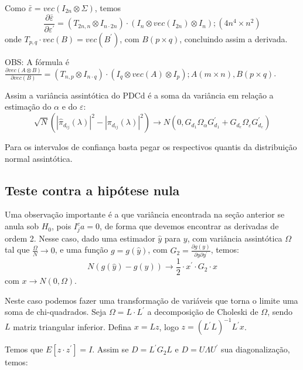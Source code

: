 \documentclass[a4paper,10pt]{article}
\begin{document}
Como $\bar{\varepsilon} = vec(I_{2n} \otimes \Sigma)$, temos
\begin{equation}
\frac{\partial \bar{\varepsilon}}{\partial \varepsilon^{'}} = (T_{2n,n} \otimes I_{n \cdot 2n}) \cdot (I_{n} \otimes vec(I_{2n}) \otimes I_{n}); (4n^{4} \times n^{2})
\end{equation}
onde $T_{p,q} \cdot vec(B) = vec(B^{'})$, com $B (p \times q)$, concluindo assim a derivada.

OBS: A fórmula é $\frac{\partial vec(A \otimes B)}{\partial vec(B)} = (T_{n,p} \otimes I_{n \cdot q}) \cdot (I_{q} \otimes vec(A) \otimes I_{p}); A (m \times n), B (p \times q)$.

Assim a variância assintótica do PDCd é a soma da variância em relação a estimação do $\alpha$ e do $\varepsilon$:
\begin{equation}
\sqrt{N} (|\hat{\pi}_{d_{ij}}(\lambda)|^{2} - |\pi_{d_{ij}}(\lambda)|^{2}) \to N(0, G_{d_1} \Omega_{\alpha} G_{d_1}^{'} + G_{d_e} \Omega_{\varepsilon} G_{d_e}^{'}) 
\end{equation}

Para os intervalos de confiança basta pegar os respectivos quantis da distribuição normal assintótica.

\subsection{Teste contra a hipótese nula}

Uma observação importante é a que variância encontrada na seção anterior se anula sob $H_0$, pois $I_{j}^{c} a = 0$, de forma que devemos encontrar as derivadas de ordem 2. Nesse caso, dado uma estimador $\hat{y}$ para $y$, com variância assintótica $\Omega$ tal que $\frac{\Omega}{N} \to 0$, e uma função $g = g(\hat{y})$, com $G_2 = \frac{\partial g(y)}{\partial y \partial y^{'}}$, temos:
\begin{equation}
N (g(\hat{y}) - g(y)) \to \frac{1}{2} \cdot x^{'} \cdot G_2 \cdot x
\end{equation}
com $x \to N(0, \Omega)$.

Neste caso podemos fazer uma transformação de variáveis que torna o limite uma soma de chi-quadrados. Seja $\Omega = L \cdot L^{'}$ a decomposição de Choleski de $\Omega$, sendo $L$ matriz triangular inferior. Defina $x = Lz$, logo $z = (L^{'}L)^{-1} L^{'} x$.

Temos que $E[z \cdot z^{'}] = I$. Assim se $D = L^{'} G_2 L$ e $D = U \Lambda U^{'}$ sua diagonalização, temos:
\end{document}
